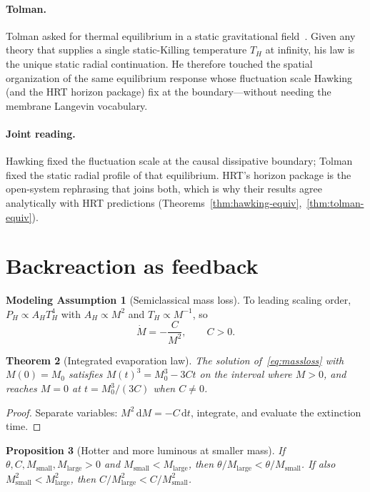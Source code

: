\documentclass[11pt]{article}
\newtheorem{theorem}{Theorem}[section]
\newtheorem{proposition}[theorem]{Proposition}
\theoremstyle{definition}
\newtheorem{model}[theorem]{Modeling Assumption}
\theoremstyle{remark}
\newcommand{\dd}{\mathrm{d}}
\begin{document}
\paragraph{Tolman.}
Tolman asked for thermal equilibrium in a static gravitational
field~\cite{Tolman1930,TolmanEhrenfest1930}.
Given any theory that supplies a single static-Killing temperature $T_H$ at infinity,
his law is the unique static radial continuation.
He therefore touched the spatial organization of the same equilibrium response whose
fluctuation scale Hawking (and the HRT horizon package) fix at the boundary---without
needing the membrane Langevin vocabulary.

\paragraph{Joint reading.}
Hawking fixed the fluctuation scale at the causal dissipative boundary; Tolman fixed
the static radial profile of that equilibrium.
HRT's horizon package is the open-system rephrasing that joins both, which is why their
results agree analytically with HRT predictions
(Theorems~\ref{thm:hawking-equiv},~\ref{thm:tolman-equiv}).

\section{Backreaction as feedback}
\label{sec:backreact}
\begin{model}[Semiclassical mass loss]
\label{mod:mass}
To leading scaling order, $P_H\propto A_H T_H^4$ with $A_H\propto M^2$ and
$T_H\propto M^{-1}$, so
\begin{equation}
\label{eq:massloss}
\dot M=-\frac{C}{M^2},\qquad C>0.
\end{equation}
\end{model}

\begin{theorem}[Integrated evaporation law]
\label{thm:evap}
The solution of~\eqref{eq:massloss} with $M(0)=M_0$ satisfies
$M(t)^3=M_0^3-3Ct$ on the interval where $M>0$, and reaches $M=0$ at
$t=M_0^3/(3C)$ when $C\neq0$.
\end{theorem}

\begin{proof}
Separate variables: $M^2\,\dd M=-C\,\dd t$, integrate, and evaluate the extinction time.
\end{proof}

\begin{proposition}[Hotter and more luminous at smaller mass]
\label{prop:feedback}
If $\theta,C,M_{\mathrm{small}},M_{\mathrm{large}}>0$ and $M_{\mathrm{small}}<M_{\mathrm{large}}$,
then $\theta/M_{\mathrm{large}}<\theta/M_{\mathrm{small}}$.
If also $M_{\mathrm{small}}^2<M_{\mathrm{large}}^2$, then
$C/M_{\mathrm{large}}^2<C/M_{\mathrm{small}}^2$.
\end{proposition}
\end{document}
